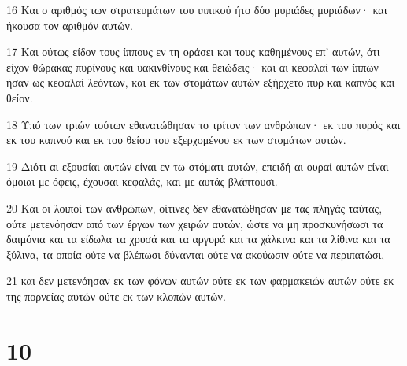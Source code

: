 \par 16 Και ο αριθμός των στρατευμάτων του ιππικού ήτο δύο μυριάδες μυριάδων· και ήκουσα τον αριθμόν αυτών.
\par 17 Και ούτως είδον τους ίππους εν τη οράσει και τους καθημένους επ' αυτών, ότι είχον θώρακας πυρίνους και υακινθίνους και θειώδεις· και αι κεφαλαί των ίππων ήσαν ως κεφαλαί λεόντων, και εκ των στομάτων αυτών εξήρχετο πυρ και καπνός και θείον.
\par 18 Υπό των τριών τούτων εθανατώθησαν το τρίτον των ανθρώπων· εκ του πυρός και εκ του καπνού και εκ του θείου του εξερχομένου εκ των στομάτων αυτών.
\par 19 Διότι αι εξουσίαι αυτών είναι εν τω στόματι αυτών, επειδή αι ουραί αυτών είναι όμοιαι με όφεις, έχουσαι κεφαλάς, και με αυτάς βλάπτουσι.
\par 20 Και οι λοιποί των ανθρώπων, οίτινες δεν εθανατώθησαν με τας πληγάς ταύτας, ούτε μετενόησαν από των έργων των χειρών αυτών, ώστε να μη προσκυνήσωσι τα δαιμόνια και τα είδωλα τα χρυσά και τα αργυρά και τα χάλκινα και τα λίθινα και τα ξύλινα, τα οποία ούτε να βλέπωσι δύνανται ούτε να ακούωσιν ούτε να περιπατώσι,
\par 21 και δεν μετενόησαν εκ των φόνων αυτών ούτε εκ των φαρμακειών αυτών ούτε εκ της πορνείας αυτών ούτε εκ των κλοπών αυτών.

\chapter{10}

